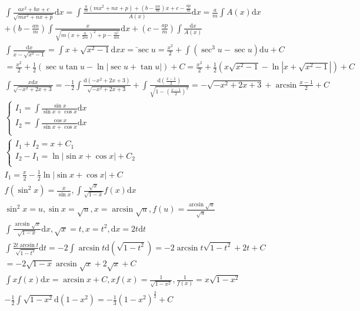 \documentclass{article}
\begin{document}
\begin{align*}
    \int \frac{ax^2+bx+c}{\sqrt{mx^2+nx+p}}\mathrm{d}x = \int \frac{\frac{a}{m}(mx^2+nx+p) + \left(b - \frac{an}{m}\right)x+c-\frac{ap}{m}}{A(x)} \mathrm{d}x = \frac{a}{m}\int A(x) \mathrm{d}x \\
    + \left(b - \frac{an}{m}\right) \int \frac{x}{\sqrt{m(x+\frac{n}{2m})^2+p-\frac{n^2}{4m}}} \mathrm{d}x + \left(c-\frac{ap}{m}\right)\int \frac{\mathrm{d}x}{A(x)} \\
    \int \frac{\mathrm{d}x}{x-\sqrt{x^2-1}} = \int x+\sqrt{x^2-1} \mathrm{d}x \underrightarrow{x = \sec u} = \frac{x^2}{2} + \int (\sec^3 u - \sec u) \mathrm{d}u + C \\
    = \frac{x^2}{2} + \frac{1}{2} \left(\sec u\tan u - \ln|\sec u + \tan u|\right) + C = \frac{x^2}{2} + \frac{1}{2}\left( x\sqrt{x^2-1}-\ln|x+\sqrt{x^2-1}|\right) + C\\
    \int \frac{x\mathrm{d}x}{\sqrt{-x^2+2x+3}} = -\frac{1}{2} \int \frac{\mathrm{d}(-x^2+2x+3)}{\sqrt{-x^2+2x+3}} + \int \frac{\mathrm{d}(\frac{x-1}{2})}{\sqrt{1-(\frac{x-1}{2})^2}} = - \sqrt{-x^2+2x+3} + \arcsin\frac{x-1}{2} + C \\
    \left\{
        \begin{array}{rl}
            I_{1} = \int \frac{\sin x}{\sin x + \cos x} \mathrm{d}x \\
            I_{2} = \int \frac{\cos x}{\sin x + \cos x} \mathrm{d}x \\
        \end{array}
    \right. \\
    \left\{
        \begin{array}{rl}
            I_{1} + I_{2} = x + C_{1} \\
            I_{2} - I_{1} = \ln |\sin x + \cos x| + C_{2} \\         
        \end{array}
    \right. \\
    I_{1} = \frac{x}{2}- \frac{1}{2} \ln |\sin x + \cos x| + C \\ 
    f(\sin^2 x) = \frac{x}{\sin x} ,\int \frac{\sqrt{x}}{\sqrt{1-x}}f(x)\mathrm{d}x \\
    \sin^2 x = u , \sin x = \sqrt{u} , x = \arcsin \sqrt{u},f(u) = \frac{\arcsin \sqrt{u}}{\sqrt{u}} \\
    \int \frac{\arcsin \sqrt{x}}{\sqrt{1-x}} \mathrm{d}x , \sqrt{x} = t,x = t^2,\mathrm{d}x = 2t\mathrm{d}t \\
    \int \frac{2t\arcsin t}{\sqrt{1-t^2}} \mathrm{d}t = -2 \int \arcsin t \mathrm{d}(\sqrt{1-t^2}) = -2 \arcsin t\sqrt{1-t^2} + 2t + C \\
    = -2\sqrt{1-x}\arcsin \sqrt{x} + 2\sqrt{x} + C \\ 
   \int xf(x)\mathrm{d}x = \arcsin x + C ,xf(x) = \frac{1}{\sqrt{1-x^2}} , \frac{1}{f(x)} = x\sqrt{1-x^2} \\
   -\frac{1}{2} \int \sqrt{1-x^2} \mathrm{d}(1-x^2) = -\frac{1}{3}(1-x^2)^{\frac{3}{2}} + C\\
\end{align*}
\end{document}
